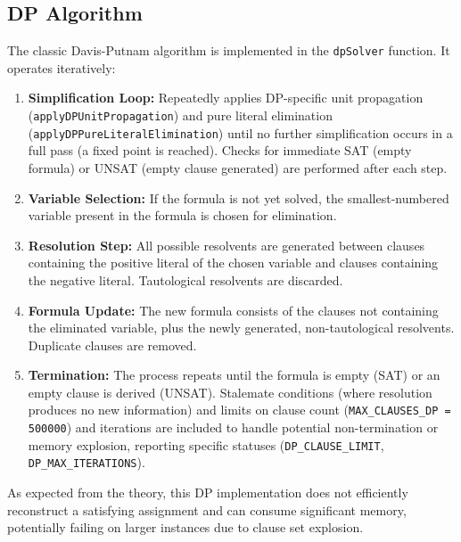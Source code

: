 \documentclass[12pt, a4paper]{article}
\begin{document}
\subsection{DP Algorithm}
The classic Davis-Putnam algorithm is implemented in the \texttt{dpSolver} function. It operates iteratively:
\begin{enumerate}
    \item \textbf{Simplification Loop:} Repeatedly applies DP-specific unit propagation (\texttt{applyDPUnitPropagation}) and pure literal elimination (\texttt{applyDPPureLiteralElimination}) until no further simplification occurs in a full pass (a fixed point is reached). Checks for immediate SAT (empty formula) or UNSAT (empty clause generated) are performed after each step.
    \item \textbf{Variable Selection:} If the formula is not yet solved, the smallest-numbered variable present in the formula is chosen for elimination.
    \item \textbf{Resolution Step:} All possible resolvents are generated between clauses containing the positive literal of the chosen variable and clauses containing the negative literal. Tautological resolvents are discarded.
    \item \textbf{Formula Update:} The new formula consists of the clauses not containing the eliminated variable, plus the newly generated, non-tautological resolvents. Duplicate clauses are removed.
    \item \textbf{Termination:} The process repeats until the formula is empty (SAT) or an empty clause is derived (UNSAT). Stalemate conditions (where resolution produces no new information) and limits on clause count (\texttt{MAX\_CLAUSES\_DP = 500000}) and iterations are included to handle potential non-termination or memory explosion, reporting specific statuses (\texttt{DP\_CLAUSE\_LIMIT}, \texttt{DP\_MAX\_ITERATIONS}).
\end{enumerate}
As expected from the theory, this DP implementation does not efficiently reconstruct a satisfying assignment and can consume significant memory, potentially failing on larger instances due to clause set explosion.
\end{document}
